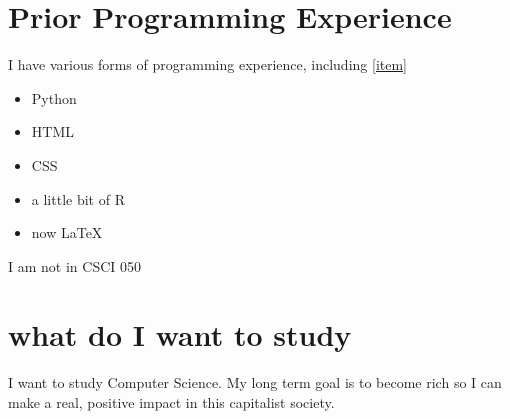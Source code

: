 \documentclass{article}
\begin{document}
\section{Prior Programming Experience}
I have various forms of programming experience, including \ref{item}
\begin{itemize}
    \item Python
    \item HTML
    \item CSS
    \item a little bit of R
    \item now LaTeX
    \label{item}
\end{itemize}

\begin{center}
I am not in CSCI 050
\end{center}
\section{what do I want to study}
I want to study Computer Science. My long term goal is to become rich so I can make a real, positive impact in this capitalist society.
\end{document}
